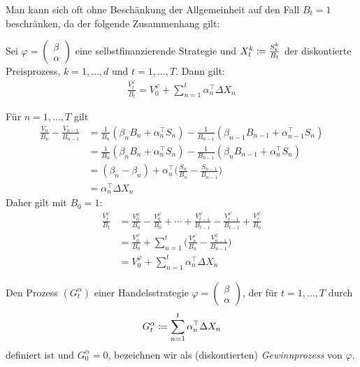\documentclass[a4paper,twoside,DIV15,BCOR12mm]{scrbook}
\begin{document}
Man kann sich oft ohne Beschänkung der Allgemeinheit auf den Fall $B_t=1$ beschränken, da der folgende Zusammenhang gilt:
\begin{lemma}
\label{lem:2.3.6}Sei $\varphi
=\left(\begin{smallmatrix}
\beta \\ \alpha
\end{smallmatrix}\right)$ eine selbstfinanzierende Strategie und $X_t^k \da \frac{S_t^k}{B_t}$ der diskontierte Preisprozess, $k=1,\ldots,d$ und $t=1,\ldots,T$. Dann gilt:
\begin{align*}
\frac{V_t^\varphi}{B_t} = V_0^\varphi + \sum_{n=1}^t \alpha_n^\top \Delta X_n
\end{align*}
\end{lemma}

\begin{beweis}
Für $n=1,\ldots,T$ gilt
\begin{align*}
\frac{V_n}{B_n} - \frac{V_{n-1}}{B_{n-1}} 
&= \frac 1 {B_n} (\beta_n B_n + \alpha_n^\top S_n) - \frac1{B_{n-1}}(\beta_{n-1}B_{n-1} + \alpha_{n-1}^\top S_n) \\
&= \frac 1 {B_n} (\beta_n B_n + \alpha_n^\top S_n) - \frac1{B_{n-1}}(\beta_{n}B_{n-1} + \alpha_{n}^\top S_n) \\
&= (\beta_n - \beta_n) + \alpha_n^\top \bigg(\frac{S_n}{B_n} - \frac{S_{n-1}}{B_{n-1}}\bigg) \\
&= \alpha_n^\top \Delta X_n
\end{align*}
Daher gilt mit $B_0=1$:
\begin{align*}
\frac{V_t^\varphi}{B_t} 
&= \frac{V_0^\varphi}{B_0} - \frac{V_0^\varphi}{B_0} + \cdots + \frac{V_{t-1}^\varphi}{B_{t-1}} - \frac{V_{t-1}^\varphi}{B_{t-1}} + \frac{V_t^\varphi}{B_0} \\
&= \frac{V_0^\varphi}{B_0} + \sum_{n=1}^t \bigg(\frac{V_n^\varphi}{B_n} -  \frac{V_{n-1}^\varphi}{B_{n-1}}\bigg) \\
&= V_0^\varphi + \sum_{n=1}^t \alpha_n^\top \Delta X_n
\end{align*}
\end{beweis}

\begin{definition}
Den Prozess $(G_t^\alpha)$ einer Handelsstrategie $\varphi
=\left(\begin{smallmatrix}
\beta \\ \alpha
\end{smallmatrix}\right)$, der für $t=1,\ldots,T$ durch
\[
G_t^\alpha  \da \sum_{n=1}^t \alpha_n^\top \Delta X_n
\]
definiert ist und $G_0^\alpha = 0$, bezeichnen wir als (diskontierten) \emph{Gewinnprozess} von $\varphi$.
\end{definition}
\end{document}
